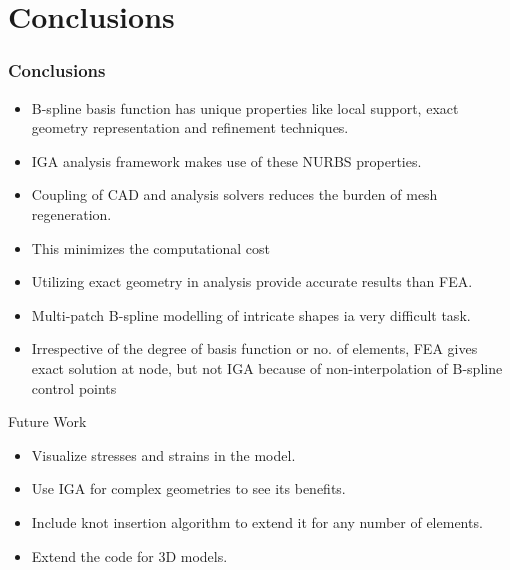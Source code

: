 \documentclass{beamer}
\begin{document}
\section{Conclusions}
\begin{frame} \frametitle{Conclusions}
  \begin{itemize}
      \item B-spline basis function has unique properties like local support, exact geometry representation and refinement techniques.
      \item IGA analysis framework makes use of these NURBS properties.
      \item Coupling of CAD and analysis solvers reduces the burden of mesh regeneration.
      \item This minimizes the computational cost
      \item Utilizing exact geometry in analysis provide accurate results than FEA. 
      \item Multi-patch B-spline modelling of intricate shapes ia very difficult task.
      \item Irrespective of the degree of basis function or no. of elements, FEA gives exact solution at node, but not IGA because of non-interpolation of B-spline control points      
  \end{itemize}
\end{frame}
\newpage
\begin{frame}{Future Work}
\begin{itemize}
    \item Visualize stresses and strains in the model.
    \item Use IGA for complex geometries to see its benefits.
    \item Include knot insertion algorithm to extend it for any number of elements.
    \item Extend the code for 3D models.
    
\end{itemize}
    
\end{frame}

\end{document}
